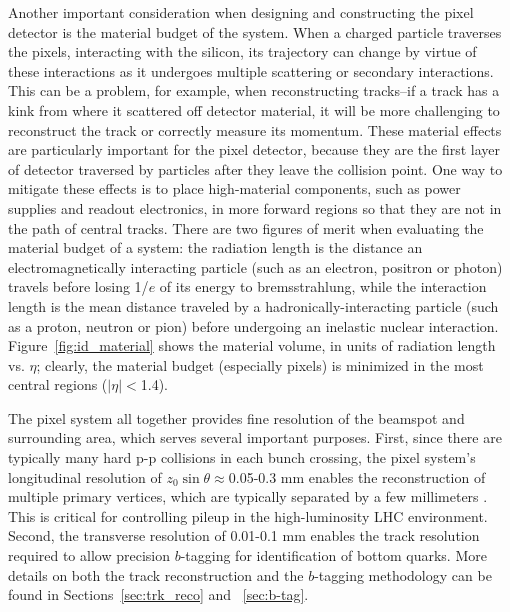 Another important consideration when designing and constructing the pixel detector is the material budget of the system.  When a 
charged particle traverses the pixels, interacting with the silicon, its trajectory can change by virtue of these interactions 
as it undergoes multiple scattering or secondary interactions.  This can be a problem, for example, when reconstructing 
tracks--if a track has a kink from where it scattered off detector material, it will be more 
challenging to reconstruct the track or correctly measure its momentum.  These material effects are particularly important for the pixel 
detector, because they are the first layer of detector traversed by particles after they leave the collision point.  
One way to mitigate these effects is to place high-material components, such as power supplies and readout 
electronics, in more forward regions so that they are not in the path of central tracks.  There are 
two figures of merit when evaluating the material budget of a system: the radiation length is the distance an 
electromagnetically interacting particle (such as an electron, positron or photon) travels before losing 1/$e$ 
of its energy to bremsstrahlung, while the interaction length is the mean distance traveled by a hadronically-interacting 
particle (such as a proton, neutron or pion) before undergoing an inelastic nuclear interaction.  Figure~\ref{fig:id_material} 
shows the material volume, in units of radiation length vs. $\eta$; clearly, the material budget 
(especially pixels) is minimized in the most central regions ($|\eta|<$1.4).


The pixel system all together provides fine resolution of the beamspot and surrounding area, 
which serves several important purposes.  First, since there are typically many hard 
p-p collisions in each bunch crossing, the pixel 
system's longitudinal resolution of $z_0\sin\theta\approx$0.05-0.3 mm 
enables the reconstruction of multiple primary vertices, which are typically separated by a few millimeters \cite{pixel_res}.  This 
is critical for controlling pileup in the high-luminosity LHC environment.  Second, the transverse resolution of 0.01-0.1 mm 
enables the track resolution required to allow precision $b$-tagging for identification of bottom quarks.  More details
on both the track reconstruction and the $b$-tagging methodology can be found in Sections~\ref{sec:trk_reco} and ~\ref{sec:b-tag}. 


